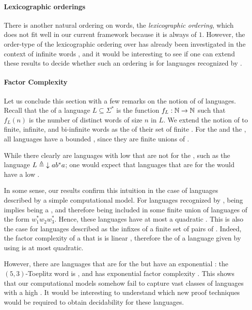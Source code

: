 \paragraph*{Lexicographic orderings} There is another natural ordering on
words, the \emph{lexicographic ordering}, which does not fit well in our
current framework because it is always of  $1$. However, the
order-type of the lexicographic ordering over  has
already been investigated in the context of infinite words \cite{CACOPU18}, and
it would be interesting to see if one can extend these results to decide
whether such an ordering is  for languages recognized by
.

\paragraph*{Factor Complexity} \AP Let us conclude this section with a few
remarks on the notion of  of languages. Recall that the
 of a language $L \subseteq \Sigma^*$ is the function
$f_L: \mathbb{N} \to \mathbb{N}$ such that $f_L(n)$ is the number of distinct words of size
$n$ in $L$. We extend the notion of  to finite, infinite,
and bi-infinite words as the  of their set of finite
. For the  and the , all
 languages have a bounded , since
they are finite unions of .

While there clearly are languages with low  that are not
 for the , such as the language $L
\defined \dwset{ a b^* a }$; one would expect that languages that are
 for the  would have a low .

In some sense, our results confirm this intuition in the case of languages
described by a simple computational model. For languages recognized by
, being  implies being a
, and therefore being  included in some finite union of
languages of the form $w_1^* w_2 w_3^*$. Hence, these languages have at most a
quadratic . This is also the case for languages described
as the infixes of a finite set of pairs of . Indeed, the
factor complexity of a  that is 
is linear \cite[Theorem 24]{NIPR09}, therefore the  of a
language given by  using  is
at most quadratic.

However, there are  languages that are
 for the  but have an exponential
: the $(5, 3)$-Toeplitz word is 
\cite[p. 499]{CAKA97}, and has exponential factor complexity \cite[Theorem
5]{CAKA97}. This shows that our computational models somehow fail to capture
vast classes of  languages with a high . It would be interesting to understand which new proof techniques
would be required to obtain decidability for these languages.
